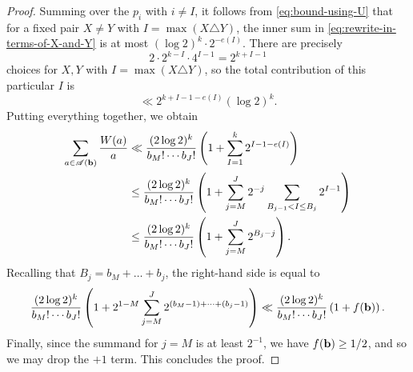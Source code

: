 \begin{proof}
    Summing over the $p_i$ with $i \ne I$, it follows from \eqref{eq:bound-using-U} that for a fixed pair $X \ne Y$ with $I = \max (X \triangle Y)$, the inner sum in \eqref{eq:rewrite-in-terms-of-X-and-Y} is at most $(\log 2)^k \cdot 2^{-e(I)}$. 
    There are precisely\footnotemark
    \begin{equation*}
        2 \cdot 2^{k- I} \cdot 4^{I - 1}  = 2^{k + I - 1}
    \end{equation*}
    choices for $X, Y$ with $I = \max (X \triangle Y)$,
    so the total contribution of this particular $I$ is 
    \begin{equation*}
        \ll 2^{k + I - 1 - e(I)} (\log 2) ^k.
    \end{equation*}
    Putting everything together, we obtain
    \begin{align*}
        \sum \limits_{a \in \mathscr{A}(\mathbf{b})} \frac{W(a)}{a} 
            &\ll \frac{(2 \log 2)^k}{b_M ! \cdots b_J!} \left( 1 + \sum \limits_{I = 1}^k 2^{I - 1 -e(I)} \right) \\
            &\le \frac{(2 \log 2)^k}{b_M ! \cdots b_J!} \left( 1 + \sum \limits_{j = M}^J 2^{-j} \sum \limits_{B_{j - 1} < I \le B_j} 2^{I - 1} \right) \\ 
            &\le  \frac{(2 \log 2)^k}{b_M ! \cdots b_J!} \left( 1 + \sum \limits_{j = M}^J 2^{B_j -j} \right).
    \end{align*}
    Recalling that $B_j = b_M + \dots + b_j$, the right-hand side is equal to
    \begin{equation*}
            \frac{(2 \log 2)^k}{b_M ! \cdots b_J!}  \left( 1 + 2^{1 - M} \sum \limits_{j = M}^J 2^{(b_M - 1) + \dots + (b_j - 1)} \right)
            \ll \frac{(2 \log 2)^k}{b_M ! \cdots b_J!}  \left( 1 + f(\mathbf{b}) \right).
    \end{equation*}
    Finally, since the summand for $j = M$ is at least $2^{-1}$, we have $f(\mathbf{b}) \ge 1/2$, and so we may drop the $+1$ term. 
    This concludes the proof.
\end{proof}

